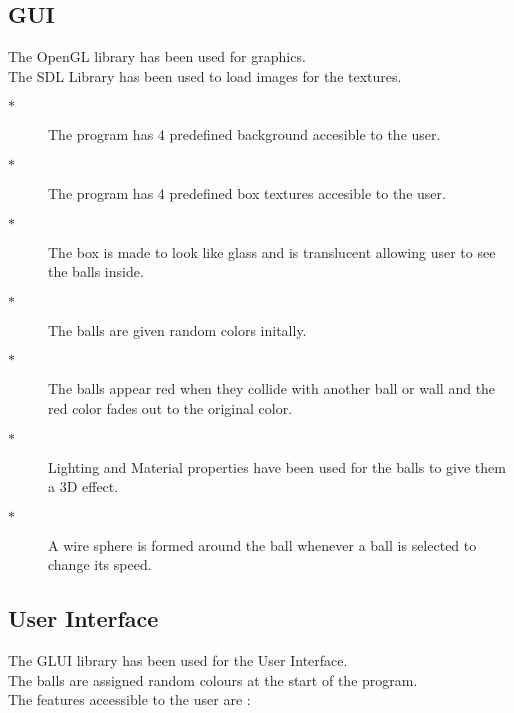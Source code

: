 \documentclass[a4paper]{article}
\begin{document}
\subsection{GUI}
The OpenGL library has been used for graphics. \\
The SDL Library has been used to load images for the textures.\\
\begin{description}

\item[$\ast$ ] The program has 4 predefined background accesible to the user. 
\item[$\ast$ ] The program has 4 predefined box textures accesible to the user. 
\item[$\ast$ ] The box is made to look like glass and is translucent allowing user to see the balls inside.
\item[$\ast$ ] The balls are given random colors initally.
\item[$\ast$ ] The balls appear red when they collide with another ball or wall and the red color fades out to the original color.
\item[$\ast$ ] Lighting and Material properties have been used for the balls to give them a 3D effect.
\item[$\ast$ ] A wire sphere is formed around the ball whenever a ball is selected to change its speed.
\end{description}
\subsection{User Interface}
The GLUI library has been used for the User Interface.\\ 
The balls are assigned random colours at the start of the program. \\
The features accessible to the user are :
\end{document}
